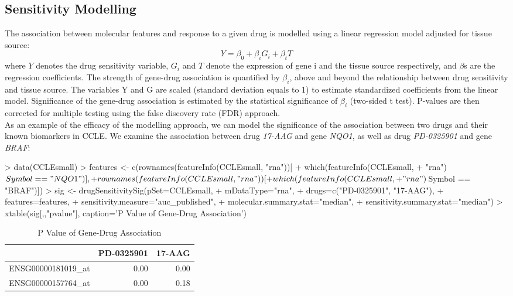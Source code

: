 \documentclass[11pt]{article}
\begin{document}
\subsection{Sensitivity Modelling}
The association between molecular features and response to a given drug is modelled using a linear regression model adjusted for tissue source: 
$$Y = \beta_{0} + \beta_{i}G_i + \beta_{t}T$$
where $Y$ denotes the drug sensitivity variable, $G_i$ and $T$ denote the expression of gene i and the tissue source respectively, and $\beta$s are the regression coefficients. The strength of gene-drug association is quantified by $\beta_i$, above and beyond the relationship between drug sensitivity and tissue source. The variables Y and G are scaled (standard deviation equals to 1) to estimate standardized coefficients from the linear model. Significance of the gene-drug association is estimated by the statistical significance of $\beta_i$ (two-sided t test). P-values are then corrected for multiple testing using the false discovery rate (FDR) approach.\\

As an example of the efficacy of the modelling approach, we can model the significance of the association between two drugs and their known biomarkers in CCLE. We examine the association between drug \textit{17-AAG} and gene \textit{NQO1}, as well as drug \textit{PD-0325901} and gene \textit{BRAF}:

\begin{Schunk}
\begin{Sinput}
>   data(CCLEsmall)
>   features <- c(rownames(featureInfo(CCLEsmall, "rna"))[
+                           which(featureInfo(CCLEsmall,
+                                             "rna")$Symbol == "NQO1")],
+                 rownames(featureInfo(CCLEsmall, "rna"))[
+                           which(featureInfo(CCLEsmall,
+                                             "rna")$Symbol == "BRAF")])
>   sig <- drugSensitivitySig(pSet=CCLEsmall, 
+                             mDataType="rna", 
+                             drugs=c("PD-0325901", "17-AAG"), 
+                             features=features, 
+                             sensitivity.measure="auc_published", 
+                             molecular.summary.stat="median", 
+                             sensitivity.summary.stat="median")
>   xtable(sig[,,"pvalue"], caption='P Value of Gene-Drug Association')
\end{Sinput}
\begin{table}[ht]
\centering
\begin{tabular}{rrr}
  \hline
 & PD-0325901 & 17-AAG \\ 
  \hline
ENSG00000181019\_at & 0.00 & 0.00 \\ 
  ENSG00000157764\_at & 0.00 & 0.18 \\ 
   \hline
\end{tabular}
\caption{P Value of Gene-Drug Association} 
\end{table}\end{Schunk}
\end{document}
